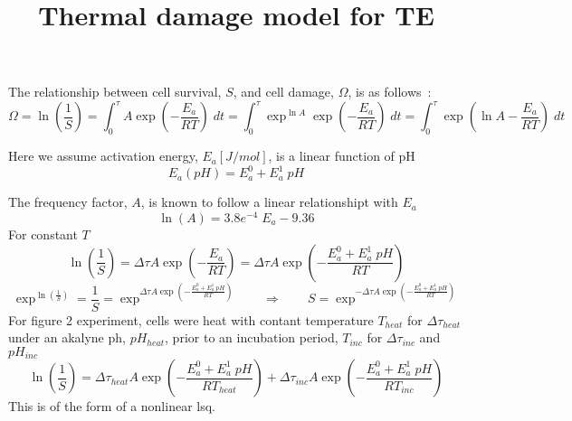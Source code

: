 \documentclass{article}         %
\title{Thermal damage model for TE}
\author{}
\theoremstyle{definition}
\theoremstyle{remark}
\begin{document}
                

The relationship between cell survival, $S$, and cell
damage, $\Omega$, is as follows~\cite{he2003quantification}:
\[
\Omega = \ln \left(\frac{1}{S}\right)
       = \int_0^\tau  A \exp\left( -\frac{E_a}{R T} \right)\; dt
       = \int_0^\tau  \exp ^{\ln A} \exp\left( -\frac{E_a}{R T} \right)\; dt
       = \int_0^\tau   \exp\left( \ln A-\frac{E_a}{R T} \right)\; dt
\]

Here we assume activation energy, $E_a [J/mol]$, is a linear function of pH
\[
   E_a(pH) = E_a^0 + E_a^1  \; pH
\]

The frequency factor, $A$, is known to follow a linear relationshipt with $E_a$
\[
  \ln (A) = 3.8e^{-4} \; E_a  - 9.36
\]
For constant $T$
\[
         \ln \left(\frac{1}{S}\right)
       = \Delta\tau  A \exp\left( -\frac{E_a}{R T} \right)
       = \Delta\tau  A \exp\left( -\frac{E_a^0 + E_a^1  \; pH}{R T} \right)
\]
\[
       \exp^{\ln \left(\frac{1}{S}\right)} = 
                   \frac{1}{S}
       = \exp^{\Delta\tau  A \exp\left( -\frac{E_a^0 + E_a^1  \; pH}{R T} \right)}
  \qquad \Rightarrow \qquad
   S = \exp^{- \Delta\tau  A \exp\left( -\frac{E_a^0 + E_a^1  \; pH}{R T} \right)}
\]
For figure 2 experiment, cells were heat with contant temperature $T_{heat}$ for $\Delta \tau_{heat}$
under an akalyne ph, $pH_{heat}$,
prior to an incubation period, $T_{inc}$ for $\Delta \tau_{inc}$ and $pH_{inc}$
\[
         \ln \left(\frac{1}{S}\right)
       = \Delta\tau_{heat}  A \exp\left( -\frac{E_a^0 + E_a^1  \; pH}{R T_{heat}} \right)
       + \Delta\tau_{inc}  A \exp\left( -\frac{E_a^0 + E_a^1  \; pH}{R T_{inc}} \right)
\]
This is of the form of a nonlinear lsq.
\end{document}
